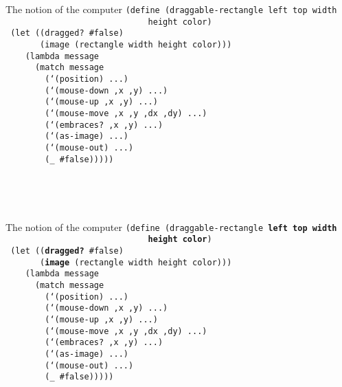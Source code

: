 \begin{frame}{The notion of the computer}
  \small
  \texttt{(define (draggable-rectangle left top width \\
    \ \ \ \ \ \ \ \ \ \ \ \ \ \ \ \ \ \ \ \ \ \ \ \ \ \ \ \ \ height color)\\
    \ (let ((dragged? \#false)\\
  \ \ \ \ \ \ \ (image (rectangle width height color)))\\
  \ \ \ \ (lambda message\\
  \ \ \ \ \ \ (match message\\
  \ \ \ \ \ \ \ \ (`(position) ...)\\
  \ \ \ \ \ \ \ \ (`(mouse-down ,x ,y) ...)\\
  \ \ \ \ \ \ \ \ (`(mouse-up ,x ,y) ...)\\
  \ \ \ \ \ \ \ \ (`(mouse-move ,x ,y ,dx ,dy) ...)\\
  \ \ \ \ \ \ \ \ (`(embraces? ,x ,y) ...)\\
  \ \ \ \ \ \ \ \ (`(as-image) ...)\\
  \ \ \ \ \ \ \ \ (`(mouse-out) ...)\\
  \ \ \ \ \ \ \ \ (\_ \#false)))))\\
  \ \\
  \ \\
  \ \\
  \ 
}
\end{frame}

\begin{frame}{The notion of the computer}
  \small
  \texttt{(define (draggable-rectangle \textbf{left top width \\
    \ \ \ \ \ \ \ \ \ \ \ \ \ \ \ \ \ \ \ \ \ \ \ \ \ \ \ \ \ height color})\\
    \ (let ((\textbf{dragged?} \#false)\\
  \ \ \ \ \ \ \ (\textbf{image} (rectangle width height color)))\\
  \ \ \ \ (lambda message\\
  \ \ \ \ \ \ (match message\\
  \ \ \ \ \ \ \ \ (`(position) ...)\\
  \ \ \ \ \ \ \ \ (`(mouse-down ,x ,y) ...)\\
  \ \ \ \ \ \ \ \ (`(mouse-up ,x ,y) ...)\\
  \ \ \ \ \ \ \ \ (`(mouse-move ,x ,y ,dx ,dy) ...)\\
  \ \ \ \ \ \ \ \ (`(embraces? ,x ,y) ...)\\
  \ \ \ \ \ \ \ \ (`(as-image) ...)\\
  \ \ \ \ \ \ \ \ (`(mouse-out) ...)\\
  \ \ \ \ \ \ \ \ (\_ \#false)))))\\
  \ \\
  \ \\
  \ \\
  \ 
}
\end{frame}

